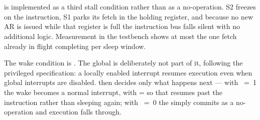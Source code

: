 \section{}

 is implemented as a third stall condition rather than as a
no-operation. S2 freezes on the instruction, S1 parks its fetch in the holding
register, and because no new AR is issued while that register is full the
instruction bus falls silent with no additional logic. Measurement in the
testbench shows at most the one fetch already in flight completing per sleep
window.

The wake condition is . The global
 is deliberately not part of it, following the privileged
specification: a locally enabled interrupt resumes execution even when global
interrupts are disabled.  then decides only what happens next --- with
~=~1 the wake becomes a normal interrupt, with  = 
so that  resumes past the instruction rather than sleeping again; with
~=~0 the  simply commits as a no-operation and execution falls
through.
